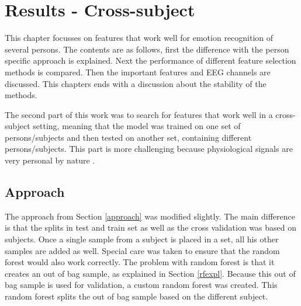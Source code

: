 \chapter{Results - Cross-subject}
{\samenvatting This chapter focusses on features that work well for emotion recognition of several persons. The contents are as follows, first the difference with the person specific approach is explained. Next the performance of different feature selection methods is compared. Then the important features and EEG channels are discussed. This chapters ends with a discussion about the stability of the methods.}

The second part of this work was to search for features that work well in a cross-subject setting, meaning that the model was trained on one set of persons/subjects and then tested on another set, containing different persons/subjects. This part is more challenging because physiological signals are very personal by nature \citep{DEAP}.

\section{Approach}

The approach from Section \ref{approach} was modified slightly. The main difference is that the splits in test and train set as well as the cross validation was based on subjects. Once a single sample from a subject is placed in a set, all his other samples are added as well. Special care was taken to ensure that the random forest would also work correctly. The problem with random forest is that it creates an out of bag sample, as explained in Section \ref{rfexpl}. Because this out of bag sample is used for validation, a custom random forest was created. This random forest splits the out of bag sample based on the different subject.

